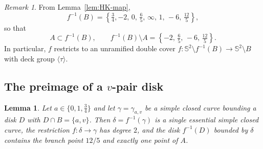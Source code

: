 \documentclass[12pt]{article}
\newtheorem{lemma}[theorem]{Lemma}
\theoremstyle{definition}
\theoremstyle{remark}
\newtheorem{remark}[theorem]{Remark}
\numberwithin{equation}{section}
\newcommand{\Sph}{\mathbb S}
\begin{document}
\begin{remark}
\label{rem:fminus-one-B}
From Lemma~\ref{lem:HK-map},
\[
f^{-1}(B)=\left\{\tfrac34,-2,\,0,\,\tfrac65,\,\infty,\,1,\,-6,\,\tfrac{12}{5}\right\},
\]
so that
\[
A\subset f^{-1}(B),\qquad
f^{-1}(B)\setminus A=\left\{-2,\,\tfrac65,\,-6,\,\tfrac{12}{5}\right\}.
\]
In particular, $f$ restricts to an unramified double cover
$f:\Sph^{2}\setminus f^{-1}(B)\to\Sph^{2}\setminus B$ with deck group
$\langle\tau\rangle$.
\end{remark}

\subsection{The preimage of a $v$-pair disk}

\begin{lemma}
\label{lem:disk-preimage}
Let $a\in\{0,1,\tfrac34\}$ and let $\gamma=\gamma_{a,v}$ be a simple
closed curve bounding a disk $D$ with $D\cap B=\{a,v\}$.  Then
$\delta=f^{-1}(\gamma)$ is a single essential simple closed curve, the
restriction $f:\delta\to\gamma$ has degree $2$, and the disk
$f^{-1}(D)$ bounded by $\delta$ contains the branch point $12/5$ and
exactly one point of $A$.
\end{lemma}
\end{document}

